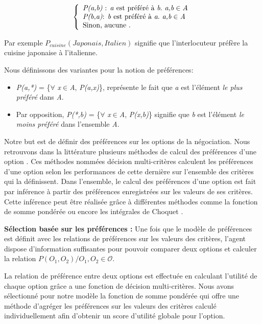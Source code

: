 \documentclass[a4paper,french]{article}
\begin{document}
\[ \left \{
\begin{array}{l}
\emph{P(a,b)} $ : \emph{a}  est préféré à $\emph{b}. \emph{ a,b} \in \emph{A}\\
\emph{P(b,a)} $:  \emph{b} est préféré à  $\emph{a}. \emph{ a,b} \in \emph{A}\\
$Sinon, aucune . $\\
\end{array}
\right .\]

Par exemple $P_{cuisine} (Japonais, Italien)$ signifie que l'interlocuteur préfère la cuisine japonaise à l'italienne. 

\par Nous définissons des variantes pour la notion de préférences:
\begin{itemize}
	\item  \emph{P(a,*)}  = \{$\forall$ \emph{x}$\in$\emph{A}, \emph{P(a,x)}\}, représente le fait que  \emph{a} est l'élément  \textit{le plus préféré} dans \emph{A}.
	\item Par opposition, \emph{P(*,b)} = \{$\forall$ \emph{x}$\in$\emph{A}, \emph{P(x,b)}\} signifie que \emph{b} est l'élément \textit{le moins préféré} dans l'ensemble \emph{A}. 
\end{itemize}


\par Notre but est de définir des préférences sur les options de la négociation.  Nous retrouvons dans la littérature plusieurs méthodes de calcul des préférences d'une option \cite{dodgson2009multi}. Ces méthodes nommées décision multi-critères calculent les préférences d'une option selon les performances de cette dernière sur l'ensemble des critères qui la définissent. Dans l'ensemble\cite{dodgson2009multi}, le calcul des préférences d'une option est fait par inférence à partir des préférences enregistrées sur les valeurs de ses critères. Cette inférence peut être réalisée grâce à différentes méthodes comme la fonction de somme pondérée \cite{yager2012ordered} ou encore les intégrales de Choquet \cite{chouquet1953}. \\

\par  \textbf{Sélection basée sur les préférences :} Une fois que le modèle de préférences est définit avec les relations de préférences sur les valeurs des critères, l'agent dispose d'information suffisantes pour pouvoir comparer deux options et calculer la relation 
$P(O_1, O_2) / O_1, O_2 \in \mathcal{O} $.

La relation de préférence entre deux options est effectuée en calculant l'utilité de chaque option grâce a une fonction de décision multi-critères. 
Nous avons sélectionné pour notre modèle la fonction de somme pondérée \cite{yager2012ordered} qui offre une méthode d'agréger les préférences sur les valeurs des critères calculé individuellement afin d'obtenir un score d'utilité globale pour l'option.
 
\end{document}
